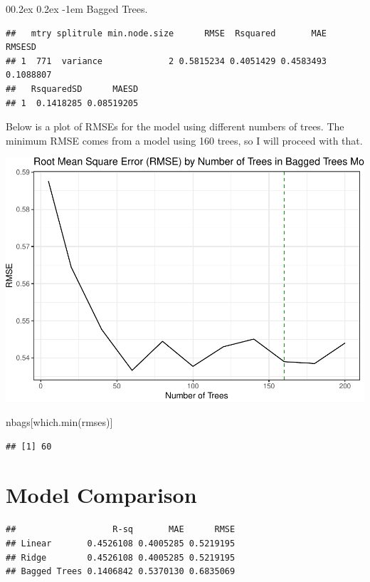 \documentclass[
  man,floatsintext]{apa6}
\makeatletter
\newenvironment{Shaded}{\begin{snugshade}}{\end{snugshade}}
\newcommand{\FunctionTok}[1]{\textcolor[rgb]{0.00,0.00,0.00}{#1}}
\newcommand{\NormalTok}[1]{#1}
\let\oldparagraph\paragraph
\renewcommand{\paragraph}[1]{\oldparagraph{#1}\mbox{}}
\renewcommand{\paragraph}{\@startsection{paragraph}{4}{\parindent}%
  {0\baselineskip \@plus 0.2ex \@minus 0.2ex}%
  {-1em}%
  {\normalfont\normalsize\bfseries\itshape\typesectitle}}
\makeatother
\begin{document}
\hypertarget{bagged-trees.}{%
\paragraph{Bagged Trees.}\label{bagged-trees.}}

\begin{verbatim}
##   mtry splitrule min.node.size      RMSE  Rsquared       MAE    RMSESD
## 1  771  variance             2 0.5815234 0.4051429 0.4583493 0.1088807
##   RsquaredSD      MAESD
## 1  0.1418285 0.08519205
\end{verbatim}

Below is a plot of RMSEs for the model using different numbers of trees. The minimum RMSE comes from a model using 160 trees, so I will proceed with that.

\includegraphics{Final_Eliott_files/figure-latex/unnamed-chunk-31-1.pdf}

\begin{Shaded}
\begin{Highlighting}[]
\NormalTok{nbags[}\FunctionTok{which.min}\NormalTok{(rmses)]}
\end{Highlighting}
\end{Shaded}

\begin{verbatim}
## [1] 60
\end{verbatim}

\hypertarget{model-comparison}{%
\section{Model Comparison}\label{model-comparison}}

\begin{verbatim}
##                   R-sq       MAE      RMSE
## Linear       0.4526108 0.4005285 0.5219195
## Ridge        0.4526108 0.4005285 0.5219195
## Bagged Trees 0.1406842 0.5370130 0.6835069
\end{verbatim}
\end{document}
